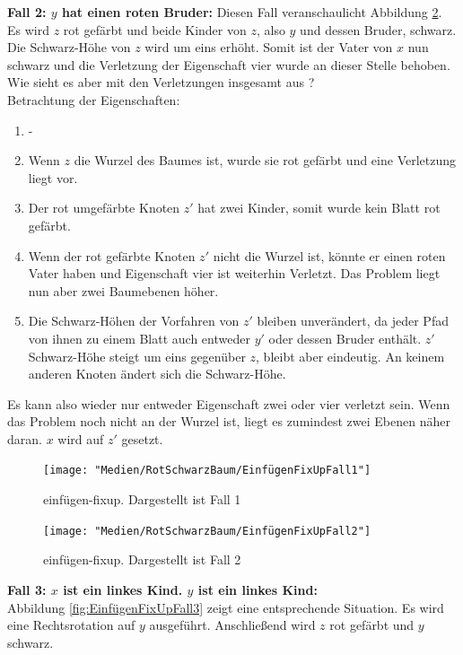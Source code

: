 \documentclass[a4paper,12pt]{article}
\begin{document}
\noindent\textbf{Fall 2: $y$ hat einen roten Bruder: }
\noindent Diesen Fall veranschaulicht Abbildung \ref{fig:EinfügenFixUpFall2}. Es wird $z$ rot gefärbt und beide Kinder von $z$, also $y$ und dessen Bruder, schwarz. Die Schwarz-Höhe von $z$ wird um eins erhöht. Somit ist der Vater von $x$ nun schwarz und die Verletzung der Eigenschaft vier wurde an dieser Stelle behoben. Wie sieht es aber mit den Verletzungen insgesamt aus ? \\

Betrachtung der Eigenschaften:

\begin{enumerate}
	\item -
	\item Wenn $z$ die Wurzel des Baumes ist, wurde sie rot gefärbt und eine Verletzung liegt vor.
	\item Der rot umgefärbte Knoten $z'$ hat zwei Kinder, somit wurde kein Blatt rot gefärbt.
	\item  Wenn der rot gefärbte Knoten $z'$ nicht die Wurzel ist, könnte er einen roten Vater haben und Eigenschaft vier ist weiterhin Verletzt. Das Problem liegt nun aber zwei Baumebenen höher.
	\item  Die Schwarz-Höhen der Vorfahren von $z'$ bleiben unverändert, da jeder Pfad von ihnen zu einem Blatt auch entweder $y'$ oder dessen Bruder enthält. $z'$ Schwarz-Höhe steigt um eins gegenüber $z$, bleibt aber eindeutig. An keinem anderen Knoten ändert sich die Schwarz-Höhe. 
	
\end{enumerate} 
Es kann also wieder nur entweder Eigenschaft zwei oder vier verletzt sein. Wenn das Problem noch nicht an der Wurzel ist, liegt es zumindest zwei Ebenen näher daran. $x$ wird auf $z'$ gesetzt. 
\begin{figure}[H]
	\centering
	\texttt{[image: "Medien/RotSchwarzBaum/EinfügenFixUpFall1"]}
	\caption{einfügen-fixup. Dargestellt ist Fall 1  }
	\label{fig:EinfügenFixUpFall1}
\end{figure}
\begin{figure}[h]
	\centering
	\texttt{[image: "Medien/RotSchwarzBaum/EinfügenFixUpFall2"]}
	\caption{einfügen-fixup. Dargestellt ist Fall 2  }
	\label{fig:EinfügenFixUpFall2}
\end{figure}

\noindent\textbf{Fall 3: $x$ ist ein linkes Kind. $y$ ist ein linkes Kind: }\\
\noindent Abbildung \ref{fig:EinfügenFixUpFall3} zeigt eine entsprechende Situation. Es wird eine Rechtsrotation auf $y$ ausgeführt. Anschließend wird $z$ rot gefärbt und $y$ schwarz. \\
\end{document}
